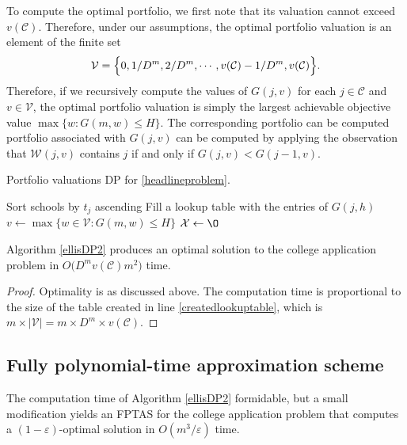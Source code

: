 To compute the optimal portfolio, we first note that its valuation cannot exceed $v(\mathcal{C})$. Therefore, under our assumptions, the optimal portfolio valuation is an element of the finite set
\begin{equation}
\mathcal{V} = \Bigl\{0, 1/D^m, 2/D^m, \cdots, v(\mathcal{C}) - 1/ D^m, v(\mathcal{C})\Bigr\}.
\end{equation}
Therefore, if we recursively compute the values of $G(j, v)$ for each $j\in \mathcal{C}$ and $v \in \mathcal{V}$, the optimal portfolio valuation is simply the largest achievable objective value $\max\{ w: G(m, w) \leq H\}$. The corresponding portfolio can be computed  portfolio associated with $G(j, v)$ can be computed by applying the observation that $\mathcal{W}(j, v)$ contains $j$ if and only if $G(j, v) < G(j-1, v)$.

\begin{algorithm}[h] 
\caption{Portfolio valuations DP for \eqref{headlineproblem}.} \label{ellisDP2}
Sort schools by $t_j$ ascending\;
Fill a lookup table with the entries of $G(j, h)$\; \label{createdlookuptable}
$v\gets  \max\{ w \in \mathcal{V} : G(m, w) \leq H\}$\; \label{vrecordedhere}
$\mathcal{X} \gets \O$\;
\;
\end{algorithm}

\begin{theorem}
Algorithm \ref{ellisDP2} produces an optimal solution to the college application problem in $O\bigl( D^m v(\mathcal{C}) m^2 \bigr)$ time.
\end{theorem}

\begin{proof}
Optimality is as discussed above. The computation time is proportional to the size of the table created in line \ref{createdlookuptable}, which is $m \times |\mathcal{V}| = m \times D^m \times v(\mathcal{C}) $. 
\end{proof}

\subsection{Fully polynomial-time approximation scheme}
The computation time of Algorithm \ref{ellisDP2} formidable, but a small modification yields an FPTAS for the college application problem that computes a $(1 - \varepsilon)$-optimal solution in $O(m^3 / \varepsilon)$ time.

